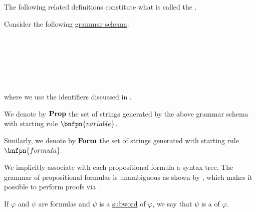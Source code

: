 \begin{definition}\label{def:propositional_syntax}\mimprovised
  The following related definitions constitute what is called the .

  \begin{thmenum}
     Consider the following \hyperref[rem:backus_normal_form]{grammar schema}:
    \begin{bnf*}
                 {} \\
               {\bnftsq{\( \vee \)} \bnfor \bnftsq{\( \wedge \)} \bnfor \bnftsq{\( \rightarrow \)} \bnfor \bnftsq{\( \leftrightarrow \)}} \\
                  { \bnfor} \\
      \bnfmore                     {\bnftsq{\( \top \)} \bnfor \bnftsq{\( \bot \)} \bnfor} \\
       \\
    \end{bnf*}
    where we use the identifiers discussed in .

     We denote by \( \operatorname{\mathbf{Prop}} \) the set of strings generated by the above grammar schema with starting rule \( \bnfpn{variable} \).

     Similarly, we denote by \( \operatorname{\mathbf{Form}} \) the set of strings generated with starting rule \( \bnfpn{formula} \).

    We implicitly associate with each propositional formula a syntax tree. The grammar of propositional formulas is unambiguous as shown by , which makes it possible to perform proofs via .

     If \( \varphi \) and \( \psi \) are formulas and \( \psi \) is a \hyperref[def:formal_language/subword]{subword} of \( \varphi \), we say that \( \psi \) is a  of \( \varphi \).


\end{thmenum}
\end{definition}
